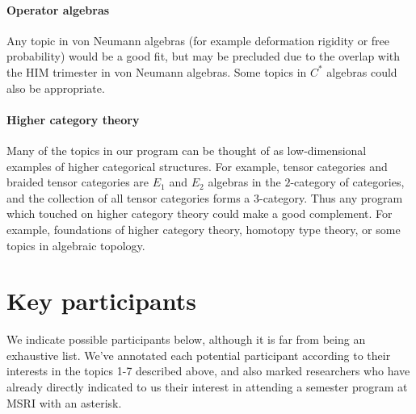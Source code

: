 \documentclass[12pt]{article}
\begin{document}
\paragraph{Operator algebras}
Any topic in von Neumann algebras (for example deformation rigidity or free probability) would be a good fit, but may be precluded due to the overlap with the HIM trimester in von Neumann algebras.  Some topics in $C^*$ algebras could also be appropriate.

\paragraph{Higher category theory}
Many of the topics in our program can be thought of as low-dimensional examples of higher categorical structures.  For example, tensor categories and braided tensor categories are $E_1$ and $E_2$ algebras in the $2$-category of categories, and the collection of all tensor categories forms a $3$-category.  Thus any program which touched on higher category theory could make a good complement.  For example, foundations of higher category theory, homotopy type theory, or some topics in algebraic topology.


\section{Key participants}
We indicate possible participants below, although it is far from being an exhaustive list. We've annotated each potential participant according to their interests in the topics 1-7 described above, and also marked researchers who have already directly indicated to us their interest in attending a semester program at MSRI with an asterisk.

\end{document}
